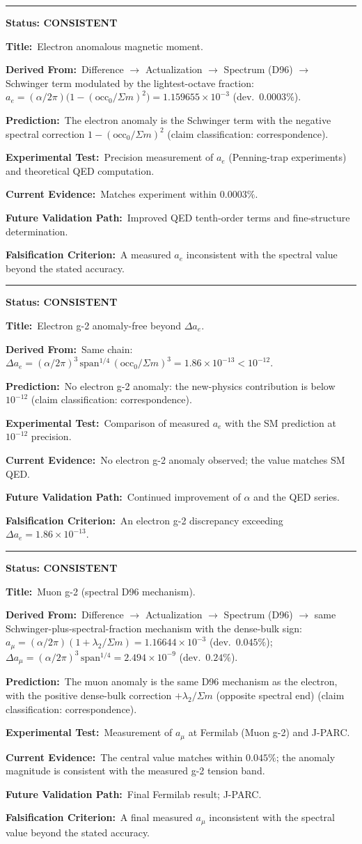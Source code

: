 \documentclass[11pt,a4paper]{article}
\newcommand{\predstart}[2]{%
  \par\medskip\noindent\hrule\par\smallskip
  \noindent{\large\bfseries #1}\hfill{\bfseries Status: #2}\par\smallskip
}
\newcommand{\pfield}[2]{%
  \noindent\textbf{#1:}~#2\par\smallskip
}
\begin{document}
\predstart{AT-P014}{CONSISTENT}
\pfield{Title}{Electron anomalous magnetic moment.}
\pfield{Derived From}{Difference $\to$ Actualization $\to$ Spectrum (D96) $\to$ Schwinger
term modulated by the lightest-octave fraction:
$a_e = (\alpha/2\pi)\bigl(1 - (\mathrm{occ}_0/\Sigma m)^2\bigr) = 1.159655\times10^{-3}$
(dev.\ $0.0003\%$).}
\pfield{Prediction}{The electron anomaly is the Schwinger term with the negative spectral
correction $1 - (\mathrm{occ}_0/\Sigma m)^2$ (claim classification: correspondence).}
\pfield{Experimental Test}{Precision measurement of $a_e$ (Penning-trap experiments) and
theoretical QED computation.}
\pfield{Current Evidence}{Matches experiment within $0.0003\%$.}
\pfield{Future Validation Path}{Improved QED tenth-order terms and fine-structure
determination.}
\pfield{Falsification Criterion}{A measured $a_e$ inconsistent with the spectral value
beyond the stated accuracy.}

\predstart{AT-P015}{CONSISTENT}
\pfield{Title}{Electron g-2 anomaly-free beyond $\Delta a_e$.}
\pfield{Derived From}{Same chain: $\Delta a_e = (\alpha/2\pi)^3\,\mathrm{span}^{1/4}\,
(\mathrm{occ}_0/\Sigma m)^3 = 1.86\times10^{-13} < 10^{-12}$.}
\pfield{Prediction}{No electron g-2 anomaly: the new-physics contribution is below
$10^{-12}$ (claim classification: correspondence).}
\pfield{Experimental Test}{Comparison of measured $a_e$ with the SM prediction at
$10^{-12}$ precision.}
\pfield{Current Evidence}{No electron g-2 anomaly observed; the value matches SM QED.}
\pfield{Future Validation Path}{Continued improvement of $\alpha$ and the QED series.}
\pfield{Falsification Criterion}{An electron g-2 discrepancy exceeding
$\Delta a_e = 1.86\times10^{-13}$.}

\predstart{AT-P016}{CONSISTENT}
\pfield{Title}{Muon g-2 (spectral D96 mechanism).}
\pfield{Derived From}{Difference $\to$ Actualization $\to$ Spectrum (D96) $\to$ same
Schwinger-plus-spectral-fraction mechanism with the dense-bulk sign:
$a_\mu = (\alpha/2\pi)(1 + \lambda_2/\Sigma m) = 1.16644\times10^{-3}$ (dev.\ $0.045\%$);
$\Delta a_\mu = (\alpha/2\pi)^3\,\mathrm{span}^{1/4} = 2.494\times10^{-9}$ (dev.\ $0.24\%$).}
\pfield{Prediction}{The muon anomaly is the same D96 mechanism as the electron, with the
positive dense-bulk correction $+\lambda_2/\Sigma m$ (opposite spectral end)
(claim classification: correspondence).}
\pfield{Experimental Test}{Measurement of $a_\mu$ at Fermilab (Muon g-2) and J-PARC.}
\pfield{Current Evidence}{The central value matches within $0.045\%$; the anomaly magnitude
is consistent with the measured g-2 tension band.}
\pfield{Future Validation Path}{Final Fermilab result; J-PARC.}
\pfield{Falsification Criterion}{A final measured $a_\mu$ inconsistent with the spectral
value beyond the stated accuracy.}
\end{document}

